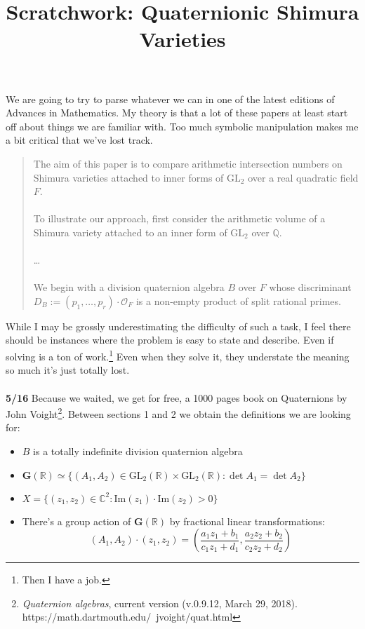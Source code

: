 \documentclass[12pt]{article}
\title{Scratchwork: Quaternionic Shimura Varieties}
\date{}
\begin{document}

\sffamily

\maketitle

\noindent We are going to try to parse whatever we can in one of the latest editions of Advances in Mathematics.  My theory is that a lot of these papers at least start off about things we are familiar with.  Too much symbolic manipulation makes me a bit critical that we've lost track. 
\begin{quotation}
The aim of this paper is to compare arithmetic intersection numbers on Shimura varieties attached to inner forms of $\text{GL}_2$ over a real quadratic field $F$. \\ \\
To illustrate our approach, first consider the arithmetic volume of a Shimura variety attached to an inner form of $\text{GL}_2$ over $\mathbb{Q}$. \\ \\ 
\dots \\\\
We begin with a division quaternion algebra $B$ over $F$  whose discriminant $D_B := (p_1,\dots,p_r)\cdot\mathcal{O}_F$ is a non-empty product of split rational primes.
\end{quotation}
While I may be grossly underestimating the difficulty of such a task, I feel there should be instances where the problem is easy to state and describe.  Even if solving is a ton of work.\footnote{Then I have a job.} Even when they solve it, they understate the meaning so much it's just totally lost.\\ \\
\textbf{5/16} Because we waited, we get for free, a 1000 pages book on Quaternions by John Voight\footnote{\textit{Quaternion algebras}, current version (v.0.9.12, March 29, 2018).
 https://math.dartmouth.edu/~jvoight/quat.html}.  Between sections 1 and 2 we obtain the definitions we are looking for:
\begin{itemize}
\item $B$ is a totally indefinite division quaternion algebra
\item $\mathbf{G}(\mathbb{R}) \simeq \{ (A_1, A_2) \in \text{GL}_2(\mathbb{R}) \times 
\text{GL}_2(\mathbb{R}): \det A_1 = \det A_2 \}$
\item $X = \{ (z_1, z_2) \in \mathbb{C}^2 : \text{Im}(z_1) \cdot \text{Im}(z_2) > 0 \}$
\item There's a group action of $\textbf{G}(\mathbb{R})$ by fractional linear transformations:
$$  (A_1, A_2) \cdot (z_1, z_2) = \left( \frac{a_1 z_1 + b_1}{c_1 z_1 + d_1}, 
\frac{a_2 z_2 + b_2}{c_2 z_2 + d_2} \right) $$
\end{itemize}
\end{document}
